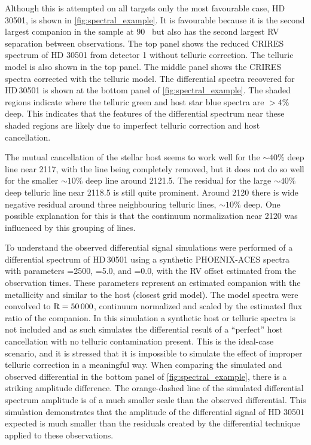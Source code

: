 Although this is attempted on all targets only the most favourable case, {HD\,30501}, is shown in \cref{fig:spectral_example}.
It is favourable because it is the second largest companion in the sample at 90~\Mjup{} but also has the second largest {RV} separation between observations.
The top panel shows the reduced CRIRES spectrum of {HD 30501} from detector 1 without telluric correction.
The telluric model is also shown in the top panel.
The middle panel shows the CRIRES spectra corrected with the telluric model.
The differential spectra recovered for {HD\,30501} is shown at the bottom panel of \cref{fig:spectral_example}.
The shaded regions indicate where the telluric {green} and host star {blue} spectra are \(> 4\%\) deep.
This indicates that the features of the differential spectrum near these shaded regions are likely due to imperfect telluric correction and host cancellation.

The mutual cancellation of the stellar host seems to work well for the \(\sim40\%\) deep line near 2117\nm{}, with the line being completely removed, but it does not do so well for the smaller \(\sim10\%\) deep line around 2121.5\nm{}.
The residual for the large \(\sim40\%\) deep telluric line near 2118.5\nm{} is still quite prominent.
Around 2120\nm{} there is wide negative residual around three neighbouring telluric lines, \(\sim10\%\) deep.
One possible explanation for this is that the continuum normalization near 2120\nm{} was influenced by this grouping of lines.

To understand the observed differential signal simulations were performed of a differential spectrum of {HD\,30501} using a synthetic {PHOENIX-ACES} spectra with parameters \Teff{}=2500\K{}, \logg{}=5.0, and \feh{}=0.0, with the {RV} offset estimated from the observation times.
These parameters represent an estimated companion \Teff{} with the metallicity and \logg{} similar to the host (closest grid model).
The model spectra were convolved to \(\textrm{R}=50\,000\), continuum normalized and scaled by the estimated flux ratio of the companion.
In this simulation a synthetic host or telluric spectra is not included and as such simulates the differential result of a ``perfect'' host cancellation with no telluric contamination present.
This is the ideal-case scenario, and it is stressed that it is impossible to simulate the effect of improper telluric correction in a meaningful way.
When comparing the simulated and observed differential in the bottom panel of \cref{fig:spectral_example}, there is a striking amplitude difference.
The orange-dashed line of the simulated differential spectrum amplitude is of a much smaller scale than the observed differential.
This simulation demonstrates that the amplitude of the differential signal of {HD 30501} expected is much smaller than the residuals created by the differential technique applied to these observations.

